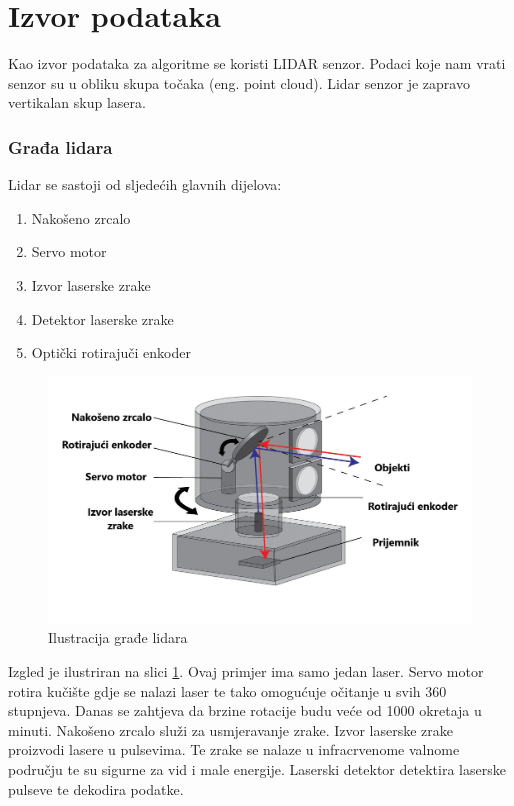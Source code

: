 \pagebreak
\section{Izvor podataka}
Kao izvor podataka za algoritme se koristi LIDAR senzor. Podaci koje nam vrati senzor su u obliku skupa točaka (eng. point cloud). Lidar senzor je zapravo vertikalan skup lasera.

\subsubsection{Građa lidara}

Lidar se sastoji od sljedećih glavnih dijelova:
\begin{enumerate}
  \item Nakošeno zrcalo
  \item Servo motor
  \item Izvor laserske zrake
  \item Detektor laserske zrake
  \item Optički rotirajuči enkoder
\end{enumerate}


\begin{figure}[ht!]
  \centering
  \includegraphics[scale=0.3]{images/lidar_arch.jpg}
  \caption{Ilustracija građe lidara\cite{lidar_arch}}
  \label{fig:lidar_arch}
\end{figure}


Izgled je ilustriran na slici \ref{fig:lidar_arch}. Ovaj primjer ima samo jedan laser. Servo motor rotira kučište gdje se nalazi laser te tako omogućuje očitanje u svih 360 stupnjeva. Danas se zahtjeva da brzine rotacije budu veće od 1000 okretaja u minuti. Nakošeno zrcalo služi za usmjeravanje zrake. Izvor laserske zrake proizvodi lasere u pulsevima. Te zrake se nalaze u infracrvenome valnome području te su sigurne za vid i male energije. Laserski detektor detektira laserske pulseve te dekodira podatke.

